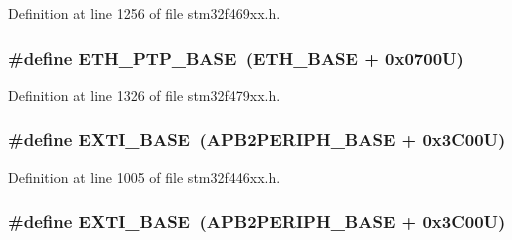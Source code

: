 Definition at line 1256 of file stm32f469xx.\+h.

\subsubsection[{\texorpdfstring{E\+T\+H\+\_\+\+P\+T\+P\+\_\+\+B\+A\+SE}{ETH_PTP_BASE}}]{\setlength{\rightskip}{0pt plus 5cm}\#define E\+T\+H\+\_\+\+P\+T\+P\+\_\+\+B\+A\+SE~({\bf E\+T\+H\+\_\+\+B\+A\+SE} + 0x0700\+U)}\hypertarget{group___peripheral__memory__map_gaa0f60b922aeb7275c785cbaa8f94ecf0}{}\label{group___peripheral__memory__map_gaa0f60b922aeb7275c785cbaa8f94ecf0}


Definition at line 1326 of file stm32f479xx.\+h.

\subsubsection[{\texorpdfstring{E\+X\+T\+I\+\_\+\+B\+A\+SE}{EXTI_BASE}}]{\setlength{\rightskip}{0pt plus 5cm}\#define E\+X\+T\+I\+\_\+\+B\+A\+SE~({\bf A\+P\+B2\+P\+E\+R\+I\+P\+H\+\_\+\+B\+A\+SE} + 0x3\+C00\+U)}\hypertarget{group___peripheral__memory__map_ga87371508b3bcdcd98cd1ec629be29061}{}\label{group___peripheral__memory__map_ga87371508b3bcdcd98cd1ec629be29061}


Definition at line 1005 of file stm32f446xx.\+h.

\subsubsection[{\texorpdfstring{E\+X\+T\+I\+\_\+\+B\+A\+SE}{EXTI_BASE}}]{\setlength{\rightskip}{0pt plus 5cm}\#define E\+X\+T\+I\+\_\+\+B\+A\+SE~({\bf A\+P\+B2\+P\+E\+R\+I\+P\+H\+\_\+\+B\+A\+SE} + 0x3\+C00\+U)}\hypertarget{group___peripheral__memory__map_ga87371508b3bcdcd98cd1ec629be29061}{}\label{group___peripheral__memory__map_ga87371508b3bcdcd98cd1ec629be29061}



